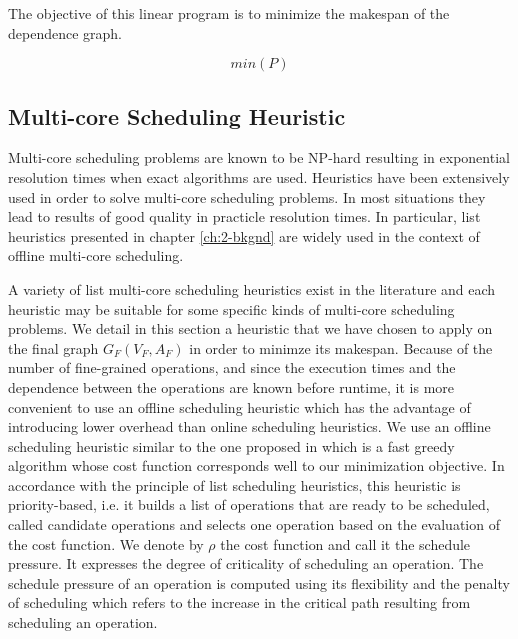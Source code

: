 The objective of this linear program is to minimize the makespan of the dependence graph.

\begin{equation}
min(P)
\label{sched:obj}
\end{equation}


\subsection{Multi-core Scheduling Heuristic}

Multi-core scheduling problems are known to be NP-hard resulting in exponential resolution times when exact algorithms are used. Heuristics have been extensively used in order to solve multi-core scheduling problems. In most situations they lead to results of good quality in practicle resolution times. In particular, list heuristics presented in chapter \ref{ch:2-bkgnd} are widely used in the context of offline multi-core scheduling.

A variety of list multi-core scheduling heuristics exist in the literature and each heuristic may be suitable for some specific kinds of multi-core scheduling problems. We detail in this section a heuristic that we have chosen to apply on the final graph $G_F(V_F,A_F)$ in order to minimze its makespan. Because of the number of fine-grained operations, and since the execution times and the dependence between the operations are known before runtime, it is more convenient to use an offline scheduling heuristic which has the advantage of introducing lower overhead than online scheduling heuristics. We use an offline scheduling heuristic similar to the one proposed in \cite{grandpierre:1999} which is a fast greedy algorithm whose cost function corresponds well to our minimization objective. In accordance with the principle of list scheduling heuristics, this heuristic is priority-based, i.e. it builds a list of operations that are ready to be scheduled, called candidate operations and selects one operation based on the evaluation of the cost function. We denote by $\rho$ the cost function and call it the schedule pressure. It expresses the degree of criticality of scheduling an operation. The schedule pressure of an operation is computed using its flexibility and the penalty of scheduling which refers to the increase in the critical path resulting from scheduling an operation.  

